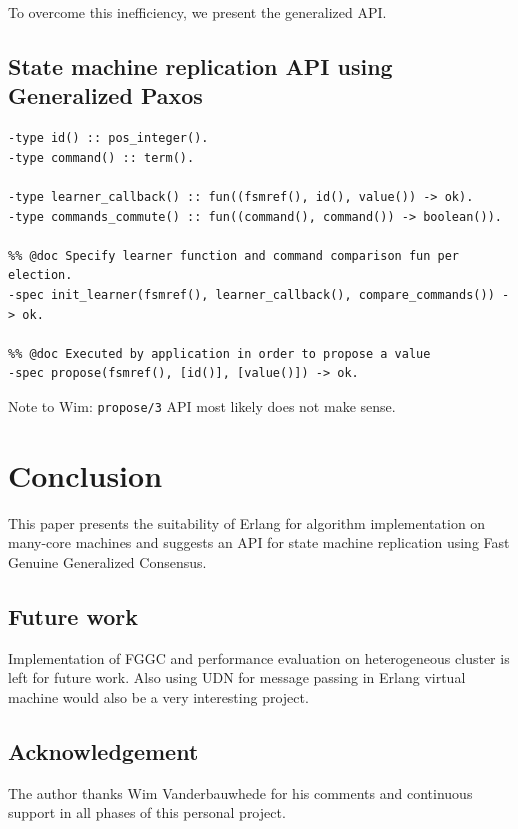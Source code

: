 \documentclass[english,11pt]{l4proj}
\newcommand{\fggc}{Fast Genuine Generalized Consensus}
\begin{document}
To overcome this inefficiency, we present the generalized API.

\subsection{State machine replication API using Generalized Paxos}

\begin{verbatim}
-type id() :: pos_integer().
-type command() :: term().

-type learner_callback() :: fun((fsmref(), id(), value()) -> ok).
-type commands_commute() :: fun((command(), command()) -> boolean()).

%% @doc Specify learner function and command comparison fun per election.
-spec init_learner(fsmref(), learner_callback(), compare_commands()) -> ok.

%% @doc Executed by application in order to propose a value
-spec propose(fsmref(), [id()], [value()]) -> ok.
\end{verbatim}

Note to Wim: {\tt propose/3} API most likely does not make sense.

\section{Conclusion}
\label{sec:conclusion}

This paper presents the suitability of Erlang for algorithm implementation on
many-core machines and suggests an API for state machine replication using
\fggc.

\subsection{Future work}
\label{sec:future-work}

Implementation of FGGC and performance evaluation on heterogeneous cluster is
left for future work. Also using UDN for message passing in Erlang virtual
machine would also be a very interesting project.

\subsection{Acknowledgement}

The author thanks Wim Vanderbauwhede for his comments and continuous support in
all phases of this personal project.
\end{document}

